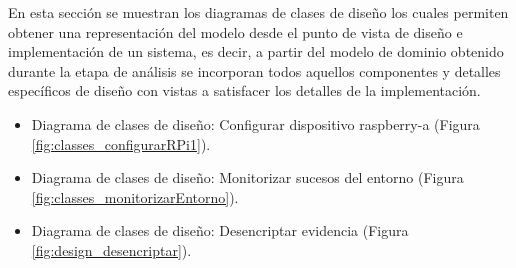 \documentclass[12pt,a4paper, twoside]{report}
\begin{document}
	En esta sección se muestran los diagramas de clases de diseño los cuales permiten obtener una representación del modelo desde el punto de vista de diseño e implementación de un sistema, es decir, a partir del modelo de dominio obtenido durante la etapa de análisis se incorporan todos aquellos componentes y detalles específicos de diseño con vistas a satisfacer los detalles de la implementación. \\
	
	\begin{itemize}
		
		\item Diagrama de clases de diseño: Configurar dispositivo \gls{raspberry-a} (Figura \ref{fig:classes_configurarRPi1}).
		
		
		\newpage
		 
		\item Diagrama de clases de diseño: Monitorizar sucesos del entorno (Figura \ref{fig:classes_monitorizarEntorno}).
		

		\newpage
		
		\item Diagrama de clases de diseño: Desencriptar evidencia (Figura \ref{fig:design_desencriptar}).

		

\end{itemize}
\end{document}
